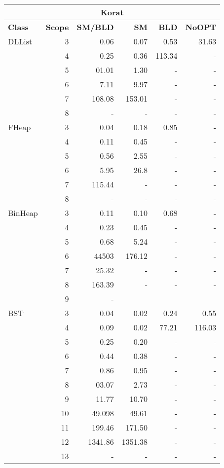 \begin{table}[H]
\scriptsize

\centering
\label{tab:results-obj3}
\begin{tabular}{ l r | r | r | r | r  }
  \toprule
  \multicolumn{6}{c}{\textbf{Korat}} \\
  \midrule 
  \textbf{Class} & \textbf{Scope} & \textbf{SM/BLD} & \textbf{SM}  & \textbf{BLD} & \textbf{NoOPT}  \\
  \midrule
  DLList
&	3	&	0.06	&	0.07	&	0.53	&	31.63	\\
&	4	&	0.25	&	0.36	&	113.34	&	-	\\
&	5	&	01.01	&	1.30	&	-	&	-	\\
&	6	&	7.11	&	9.97	&	-	&	-	\\
&	7	&	108.08	&	153.01	&	-	&	-	\\
&	8	&	-	&	-	&	-	&	-	\\
  \midrule
  FHeap
&	3	&	0.04	&	0.18	&	0.85	&	-	\\
&	4	&	0.11	&	0.45	&	-	&	-	\\
&	5	&	0.56	&	2.55	&	-	&	-	\\
&	6	&	5.95	&	26.8	&	-	&	-	\\
&	7	&	115.44	&	-	&	-	&	-	\\
&	8	&	-	&	-	&	-	&	-	\\
  \midrule
  BinHeap
&	3	&	0.11	&	0.10	&	0.68	&	-	\\
&	4	&	0.23	&	0.45	&	-	&	-	\\
&	5	&	0.68	&	5.24	&	-	&	-	\\
&	6	&	44503	&	176.12	&	-	&	-	\\
&	7	&	25.32	&	-	&	-	&	-	\\
&	8	&	163.39	&	-	&	-	&	-	\\
&	9	&	-	&		&		&		\\
  \midrule
  BST
&	3	&	0.04	&	0.02	&	0.24	&	0.55	\\
&	4	&	0.09	&	0.02	&	77.21	&	116.03	\\
&	5	&	0.25	&	0.20	&	-	&	-	\\
&	6	&	0.44	&	0.38	&	-	&	-	\\
&	7	&	0.86	&	0.95	&	-	&	-	\\
&	8	&	03.07	&	2.73	&	-	&	-	\\
&	9	&	11.77	&	10.70	&	-	&	-	\\
&	10	&	49.098	&	49.61	&	-	&	-	\\
&	11	&	199.46	&	171.50	&	-	&	-	\\
&	12	&	1341.86	&	1351.38	&	-	&	-	\\
&	13	&	-	&	-	&	-	&	-	\\

\end{tabular}
\end{table}
